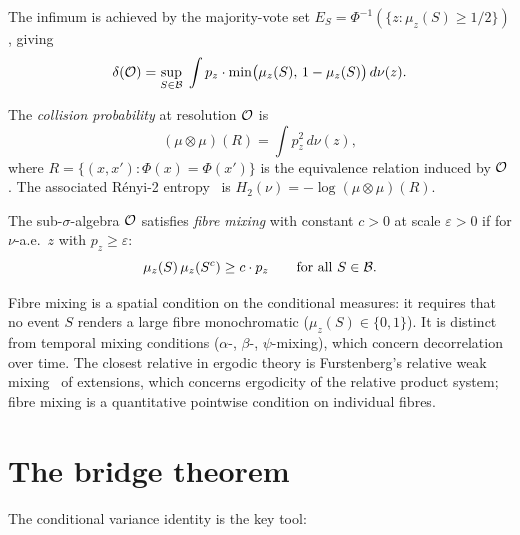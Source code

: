 \noindent The infimum is achieved by the majority-vote set
$E_S = \Phi^{-1}(\{z : \mu_z(S) \geq 1/2\})$, giving
\begin{equation}\label{eq:majority}
  \delta(\mathcal{O})
  = \sup_{S \in \mathcal{B}}\;
    \int p_z \cdot \min\bigl(\mu_z(S),\, 1 - \mu_z(S)\bigr)\,d\nu(z).
\end{equation}

\begin{definition}
\label{def:collision}
The \emph{collision probability} at resolution $\mathcal{O}$ is
\begin{equation}\label{eq:collision}
  (\mu \otimes \mu)(R)
  = \int p_z^2\,d\nu(z),
\end{equation}
where $R = \{(x, x') : \Phi(x) = \Phi(x')\}$ is the equivalence
relation induced by $\mathcal{O}$.  The associated R\'{e}nyi-2
entropy~\cite{Renyi1961} is $H_2(\nu) = -\log (\mu \otimes \mu)(R)$.
\end{definition}

\begin{definition}
\label{def:fibre-mixing}
The sub-$\sigma$-algebra $\mathcal{O}$ satisfies \emph{fibre mixing} with
constant $c > 0$ at scale $\varepsilon > 0$ if for $\nu$-a.e.\
$z$ with $p_z \geq \varepsilon$:
\begin{equation}\label{eq:fibre-mixing}
  \mu_z(S)\,\mu_z(S^c) \geq c \cdot p_z
  \qquad \text{for all } S \in \mathcal{B}.
\end{equation}
\end{definition}

\noindent Fibre mixing is a spatial condition on the conditional
measures: it requires that no event $S$ renders a large fibre
monochromatic ($\mu_z(S) \in \{0, 1\}$).  It is distinct from
temporal mixing conditions ($\alpha$-, $\beta$-, $\psi$-mixing),
which concern decorrelation over time.  The closest relative in
ergodic theory is Furstenberg's relative weak
mixing~\cite{Furstenberg1977} of extensions, which concerns
ergodicity of the relative product system; fibre mixing is a
quantitative pointwise condition on individual fibres.

\section{The bridge theorem}
\label{sec:bridge}

The conditional variance identity is the key tool:


